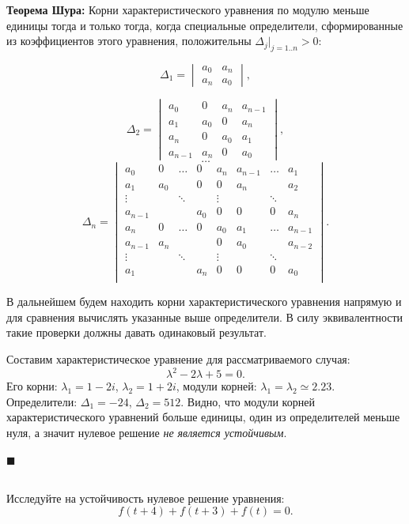 \documentclass[a4paper]{article}
\newcommand{\solutionend}{{\noindent $\blacksquare$ \\}}
\begin{document}
\textbf{Теорема Шура:} Корни характеристического уравнения по модулю меньше единицы тогда и только тогда, когда специальные определители, сформированные из коэффициентов этого уравнения, положительны $\Delta_j|_{j=1..n} > 0$:

\[
\Delta_1 = 
\begin{vmatrix}
a_0 & a_n \\
a_n & a_0
\end{vmatrix},
\]

\[
\Delta_2 = 
\begin{vmatrix}
a_0 & 0 & a_n & a_{n - 1} \\
a_1 & a_0 & 0 &  a_n \\
a_n & 0 & a_0 & a_1 \\
a_{n-1} & a_n & 0 & a_0
\end{vmatrix},
\]
\[ \dots \]
\[
\Delta_n = 
\begin{vmatrix}
a_0 & 0 & \dots & 0 & a_n & a_{n-1} & \dots & a_1 \\
a_1 & a_0 &  & 0 & 0 & a_n &  & a_2 \\
\vdots &  & \ddots & & \vdots &  & \ddots & \\
a_{n-1} &  &  & a_0 & 0 & 0 & 0 & a_{n} \\
a_{n} & 0 & \dots & 0 & a_0 & a_1 & \dots & a_{n-1} \\
a_{n-1} & a_n & &  & 0 & a_0 &  & a_{n-2} \\
\vdots &  & \ddots &  & \vdots &  & \ddots &  \\
a_1 &  &  & a_n & 0 & 0 & 0 & a_0 \\
\end{vmatrix}.
\]

В дальнейшем будем находить корни характеристического уравнения напрямую и для сравнения вычислять указанные выше определители. В силу эквивалентности такие проверки должны давать одинаковый результат.

Составим характеристическое уравнение для рассматриваемого случая:
\[
\lambda^2 - 2 \lambda + 5 = 0.
\]
Его корни: $\lambda_1 = 1 - 2i$, $\lambda_2 = 1 + 2i$, модули корней: $\lambda_1 = \lambda_2 \simeq 2.23$. Определители: $\Delta_1 = -24$, $\Delta_2 = 512$. Видно, что модули корней характеристического уравнений больше единицы, один из определителей меньше нуля, а значит нулевое решение \textit{не является устойчивым}.

\solutionend

\subsection{}
Исследуйте на устойчивость нулевое решение уравнения:
\[
	f(t + 4) + f (t + 3) + f(t) = 0.
\]
\end{document}
